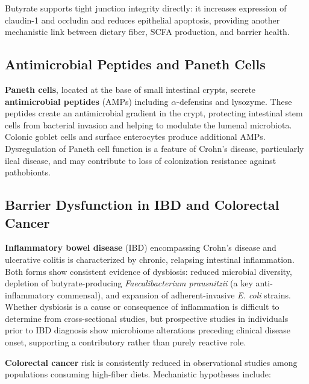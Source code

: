 \documentclass{tufte-handout}
\begin{document}
Butyrate supports tight junction integrity directly: it increases expression of claudin-1 and occludin and reduces epithelial apoptosis, providing another mechanistic link between dietary fiber, SCFA production, and barrier health.

\subsection{Antimicrobial Peptides and Paneth Cells}

\textbf{Paneth cells}, located at the base of small intestinal crypts, secrete \textbf{antimicrobial peptides} (AMPs) including $\alpha$-defensins and lysozyme. These peptides create an antimicrobial gradient in the crypt, protecting intestinal stem cells from bacterial invasion and helping to modulate the lumenal microbiota. Colonic goblet cells and surface enterocytes produce additional AMPs. Dysregulation of Paneth cell function is a feature of Crohn's disease, particularly ileal disease, and may contribute to loss of colonization resistance against pathobionts.

\subsection{Barrier Dysfunction in IBD and Colorectal Cancer}

\textbf{Inflammatory bowel disease} (IBD) encompassing Crohn's disease and ulcerative colitis is characterized by chronic, relapsing intestinal inflammation. Both forms show consistent evidence of dysbiosis: reduced microbial diversity, depletion of butyrate-producing \textit{Faecalibacterium prausnitzii} (a key anti-inflammatory commensal), and expansion of adherent-invasive \textit{E. coli} strains. Whether dysbiosis is a cause or consequence of inflammation is difficult to determine from cross-sectional studies, but prospective studies in individuals prior to IBD diagnosis show microbiome alterations preceding clinical disease onset, supporting a contributory rather than purely reactive role.

\textbf{Colorectal cancer} risk is consistently reduced in observational studies among populations consuming high-fiber diets. Mechanistic hypotheses include:
\end{document}
